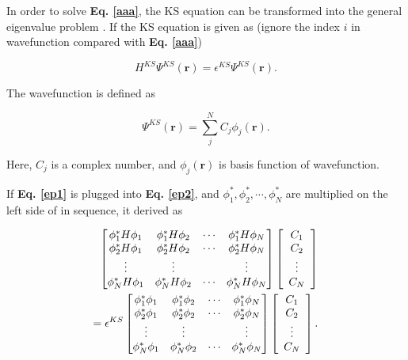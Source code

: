 \documentclass[a4paper, 12pt, titlepage,oneside,drop]{kthesis}
\begin{document}
In order to solve \textbf{Eq. \ref{aaa}}, the KS equation can be transformed into the general eigenvalue problem \cite{martin2004electronic, Cottenierwien2k}. If the KS equation is given as (ignore the index $i$ in wavefunction compared with \textbf{Eq. \ref{aaa}})

\begin{equation}\label{ep2}
 H^{KS} \Psi^{KS} (\textbf{r}) = \epsilon^{KS} \Psi^{KS} (\textbf{r}).
\end{equation}
 

The wavefunction is defined as

\begin{equation}\label{ep1}
 \Psi^{KS} (\textbf{r}) = \sum\limits_j^N C_j \phi_j (\textbf{r}).
\end{equation}
 
Here, $C_j$ is a complex number, and $\phi_j (\textbf{r})$ is basis function of wavefunction. 


If \textbf{Eq. \ref{ep1}} is plugged into \textbf{Eq. \ref{ep2}}, and $\phi^*_1, \phi^*_2, \cdots, \phi^*_N$ are multiplied on the left side of \cite{ep2} in sequence, it derived as

\begin{equation}\begin{split}\label{ep3}
\left[
\begin{matrix}
    \phi^*_1 {H} \phi_1 & \phi^*_1 {H} \phi_2 & \cdots & \phi^*_1 {H} \phi_N \\
    \phi^*_2 {H} \phi_1 & \phi^*_2 {H} \phi_2 & \cdots & \phi^*_2 {H} \phi_N \\
    \vdots               & \vdots               &        & \vdots               \\
    \phi^*_N {H} \phi_1 & \phi^*_N {H} \phi_2 & \cdots & \phi^*_N {H} \phi_N \\
\end{matrix} \right] \left[ \begin{array}{c} C_1 \\ C_2 \\ \vdots \\ C_N\end{array} \right] \\
= \epsilon^{KS} \left[
\begin{matrix}
   \phi^*_1 \phi_1 & \phi^*_1 \phi_2 & \cdots & \phi^*_1 \phi_N \\
   \phi^*_2 \phi_1 & \phi^*_2 \phi_2 & \cdots & \phi^*_2 \phi_N \\
    \vdots               & \vdots               &        & \vdots               \\
   \phi^*_N \phi_1 & \phi^*_N \phi_2 & \cdots & \phi^*_N \phi_N \\
\end{matrix} \right]\left[ \begin{array}{c} C_1 \\ C_2 \\ \vdots \\ C_N\end{array} \right].
\end{split}\end{equation}
\end{document}
